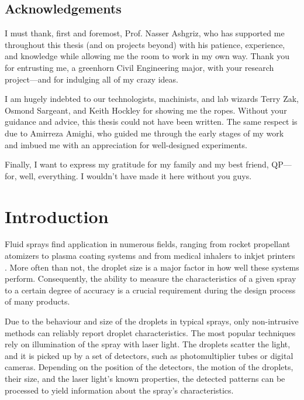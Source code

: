 \documentclass[11.5pt,oneside]{book}
\begin{document}
\section*{Acknowledgements}
\thispagestyle{plain}
I must thank, first and foremost, Prof. Nasser Ashgriz, who has supported me
throughout this thesis (and on projects beyond) with his patience, experience, and knowledge
while allowing me the room to work in my own way. Thank you for entrusting me, a
greenhorn Civil Engineering major, with your research project---and for indulging all of my crazy ideas.

I am hugely indebted to our technologists, machinists, and lab wizards
Terry Zak, Osmond Sargeant, and Keith Hockley for showing me the ropes. Without
your guidance and advice, this thesis could not have been written. The same
respect is due to Amirreza Amighi, who guided me through the early stages of my
work and imbued me with an appreciation for well-designed experiments.

Finally, I want to express my gratitude for my family and my best friend,
QP---for, well, everything. I wouldn't have made it here without you guys.
\vfill
\tableofcontents
\listoftables
\listoffigures

\mainmatter \pagestyle{fancy} \chapter{Introduction}
Fluid sprays find application in numerous fields, ranging from rocket propellant
atomizers \citep{Inoue08, Mehegan71} to plasma coating systems
\citep{Fauchais04} and from medical inhalers \citep{Newman05} to inkjet
printers \citep{Endo88}. More often than not, the droplet size is a major factor in how well
these systems perform. Consequently, the ability to measure the characteristics
of a given spray to a certain degree of accuracy is a crucial requirement
during the design process of many products.

Due to the behaviour and size of the droplets in typical sprays, only
non-intrusive methods can reliably report droplet characteristics. The most popular
techniques rely on illumination of the spray with laser light. The droplets
scatter the light, and it is picked up by a set of detectors, such as
photomultiplier tubes or digital cameras. Depending on the position of the
detectors, the motion of the droplets, their size, and the laser light's known
properties, the detected patterns can be processed to yield information about
the spray's characteristics.
\end{document}
